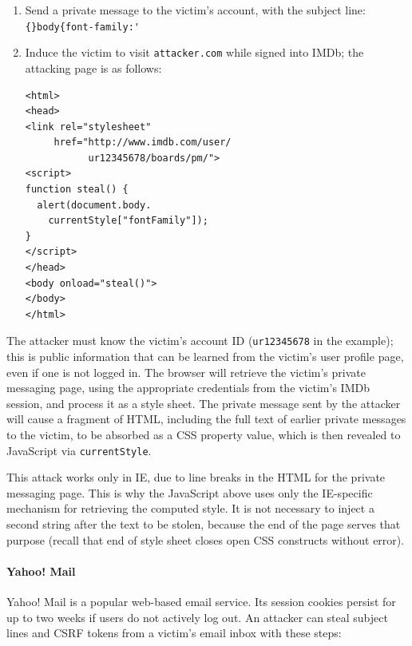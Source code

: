 \documentclass{acm_proc_article-sp}
\begin{document}
\begin{enumerate}
\item Send a private message to the victim's account, with the subject
  line: \verb|{}body{font-family:'|
\item Induce the victim to visit \texttt{attacker.com} while signed
  into IMDb; the attacking page is as follows:
\begin{verbatim}
<html>
<head>
<link rel="stylesheet"
     href="http://www.imdb.com/user/
           ur12345678/boards/pm/">
<script>
function steal() {
  alert(document.body.
    currentStyle["fontFamily"]);
}
</script>
</head>
<body onload="steal()">
</body>
</html>
\end{verbatim}
\end{enumerate}

The attacker must know the victim's account ID (\texttt{ur12345678} in
the example); this is public information that can be learned from the
victim's user profile page, even if one is not logged in.  The browser
will retrieve the victim's private messaging page, using the
appropriate credentials from the victim's IMDb session, and process it
as a style sheet.  The private message sent by the attacker will cause a
fragment of HTML, including the full text of earlier private messages
to the victim, to be absorbed as a CSS property value, which is then
revealed to JavaScript via \texttt{currentStyle}.

This attack works only in IE, due to line breaks in the HTML for the
private messaging page.  This is why the JavaScript above uses only
the IE-specific mechanism for retrieving the computed style.  It is
not necessary to inject a second string after the text to be stolen,
because the end of the page serves that purpose (recall that end of
style sheet closes open CSS constructs without error).

\paragraph{Yahoo! Mail}
Yahoo! Mail is a popular web-based email service.  Its session cookies
persist for up to two weeks if users do not actively log out.  An
attacker can steal subject lines and CSRF tokens from a victim's email
inbox with these steps:
\end{document}
